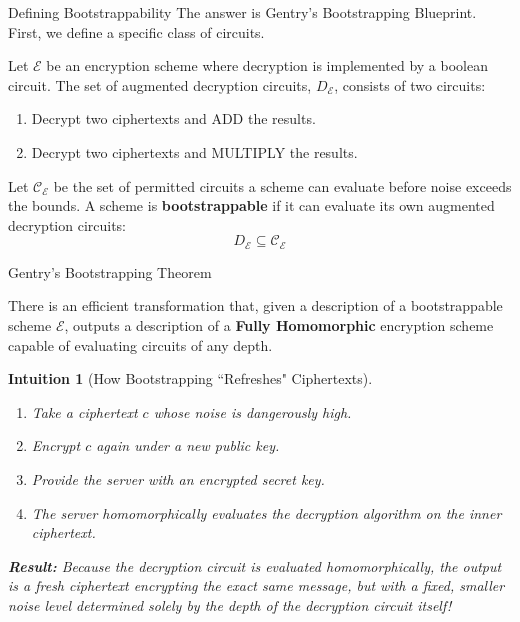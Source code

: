 \documentclass[10pt,handout]{beamer}
\newtheorem{intuition}{Intuition}
\begin{document}
\begin{frame}{Defining Bootstrappability}
    The answer is Gentry's Bootstrapping Blueprint. First, we define a specific class of circuits.
    \pause

    \vspace{0.3cm}
    \begin{definition}
    Let $\mathcal{E}$ be an encryption scheme where decryption is implemented by a boolean circuit. The set of augmented decryption circuits, $D_{\mathcal{E}}$, consists of two circuits: 
    \begin{enumerate}
        \item Decrypt two ciphertexts and ADD the results.
        \item Decrypt two ciphertexts and MULTIPLY the results.
    \end{enumerate}
    \end{definition}
    \pause

    \vspace{0.3cm}
    \begin{definition}
    Let $\mathcal{C}_{\mathcal{E}}$ be the set of permitted circuits a scheme can evaluate before noise exceeds the bounds. A scheme is \textbf{bootstrappable} if it can evaluate its own augmented decryption circuits:
    $$D_{\mathcal{E}} \subseteq \mathcal{C}_{\mathcal{E}}$$
    \end{definition}
\end{frame}

\begin{frame}{Gentry's Bootstrapping Theorem}
    \begin{theorem}
    There is an efficient transformation that, given a description of a bootstrappable scheme $\mathcal{E}$, outputs a description of a \textbf{Fully Homomorphic} encryption scheme capable of evaluating circuits of any depth.
    \end{theorem}
    \pause
    
    \vspace{0.3cm}
    \begin{intuition}[How Bootstrapping ``Refreshes" Ciphertexts]
    \begin{enumerate}
        \item Take a ciphertext $c$ whose noise is dangerously high.
        \item Encrypt $c$ \textit{again} under a new public key.
        \item Provide the server with an \textit{encrypted} secret key.
        \item The server homomorphically evaluates the decryption algorithm on the inner ciphertext.
    \end{enumerate}
    \pause
    \textbf{Result:} Because the decryption circuit is evaluated homomorphically, the output is a fresh ciphertext encrypting the exact same message, but with a fixed, smaller noise level determined solely by the depth of the decryption circuit itself!
    \end{intuition}
\end{frame}
\end{document}
